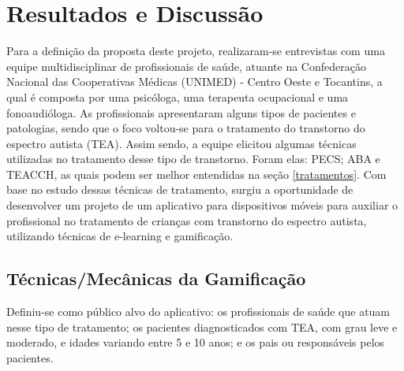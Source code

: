 \chapter{Resultados e Discussão}\label{cap:resultados}

Para a definição da proposta deste projeto, realizaram-se entrevistas com uma equipe multidisciplinar de profissionais de saúde, atuante na Confederação Nacional das Cooperativas Médicas (UNIMED) - Centro Oeste e Tocantins, a qual é composta por uma psicóloga, uma terapeuta ocupacional e uma fonoaudióloga. As profissionais apresentaram alguns tipos de pacientes e patologias, sendo que o foco voltou-se para o tratamento do transtorno do espectro autista (TEA). Assim sendo, a equipe elicitou algumas técnicas utilizadas no tratamento desse tipo de transtorno. Foram elas: PECS; ABA e TEACCH, as quais podem ser melhor entendidas na seção \ref{tratamentos}. Com base no estudo dessas técnicas de tratamento, surgiu a oportunidade de desenvolver um projeto de um aplicativo para dispositivos móveis para auxiliar o profissional no tratamento de crianças com transtorno do espectro autista, utilizando técnicas de e-learning e gamificação. 

\section{Técnicas/Mecânicas da Gamificação}
Definiu-se como público alvo do aplicativo: os profissionais de saúde que atuam nesse tipo de tratamento; os pacientes diagnosticados com TEA, com grau leve e moderado, e idades variando entre 5 e 10 anos; e os pais ou responsáveis pelos pacientes.

